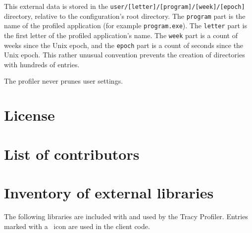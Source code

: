 \documentclass[hidelinks,titlepage,a4paper]{article}
\begin{document}
This external data is stored in the \texttt{user/[letter]/[program]/[week]/[epoch]} directory, relative to the configuration's root directory. The \texttt{program} part is the name of the profiled application (for example \texttt{program.exe}). The \texttt{letter} part is the first letter of the profiled application's name. The \texttt{week} part is a count of weeks since the Unix epoch, and the \texttt{epoch} part is a count of seconds since the Unix epoch. This rather unusual convention prevents the creation of directories with hundreds of entries.

The profiler never prunes user settings.

\newpage
\appendix
\appendixpage

\section{License}



\section{List of contributors}



\section{Inventory of external libraries}

The following libraries are included with and used by the Tracy Profiler. Entries marked with a \faStar{}~icon are used in the client code.
\end{document}
